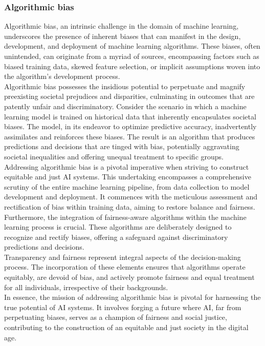 \documentclass[12pt,a4paper,openright,twoside]{book}
\begin{document}
\subsubsection{Algorithmic bias}

Algorithmic bias, an intrinsic challenge in the domain of machine learning, underscores the presence of inherent biases that can manifest in the design, development, and deployment of machine learning algorithms. These biases, often unintended, can originate from a myriad of sources, encompassing factors such as biased training data, skewed feature selection, or implicit assumptions woven into the algorithm's development process. \\
Algorithmic bias possesses the insidious potential to perpetuate and magnify preexisting societal prejudices and disparities, culminating in outcomes that are patently unfair and discriminatory. Consider the scenario in which a machine learning model is trained on historical data that inherently encapsulates societal biases. The model, in its endeavor to optimize predictive accuracy, inadvertently assimilates and reinforces these biases. The result is an algorithm that produces predictions and decisions that are tinged with bias, potentially aggravating societal inequalities and offering unequal treatment to specific groups. \cite{10.1145/2983270} \\
Addressing algorithmic bias is a pivotal imperative when striving to construct equitable and just AI systems. This undertaking encompasses a comprehensive scrutiny of the entire machine learning pipeline, from data collection to model development and deployment. It commences with the meticulous assessment and rectification of bias within training data, aiming to restore balance and fairness. \\
Furthermore, the integration of fairness-aware algorithms within the machine learning process is crucial. These algorithms are deliberately designed to recognize and rectify biases, offering a safeguard against discriminatory predictions and decisions. \\
Transparency and fairness represent integral aspects of the decision-making process. The incorporation of these elements ensures that algorithms operate equitably, are devoid of bias, and actively promote fairness and equal treatment for all individuals, irrespective of their backgrounds. \\
In essence, the mission of addressing algorithmic bias is pivotal for harnessing the true potential of AI systems. It involves forging a future where AI, far from perpetuating biases, serves as a champion of fairness and social justice, contributing to the construction of an equitable and just society in the digital age.
\end{document}
